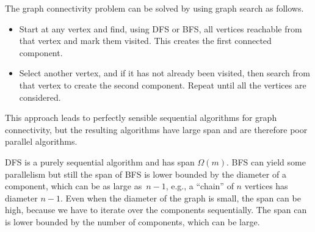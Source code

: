 \begin{gram}
\label{gr:graphcon::connect::sequential}
The graph connectivity problem can be solved by using graph search as
follows. 
\begin{itemize}
\item Start at any vertex and find, using DFS or BFS, all vertices
  reachable from that vertex and mark them visited. This creates the
  first connected component.

\item 
Select another vertex, and if it has not already been visited, then
search from that vertex to create the second component. 
%
Repeat until all the vertices are considered.
%
%
\end{itemize}

This approach leads to perfectly sensible sequential algorithms for
graph connectivity, but the resulting algorithms have large span and are therefore poor parallel algorithms.
%

DFS is a purely sequential algorithm and has span $\Omega(m)$.
%
BFS can yield some parallelism but still the span of BFS is lower bounded by the diameter of a component, which can be as large as~$n-1$, e.g.,
a ``chain'' of $n$ vertices has diameter $n-1$.
%
Even when the diameter of the graph is small, the span can be high,
because we have to iterate over the components sequentially.
%
The span can is lower bounded by the number of components, which can be large.
\end{gram}


